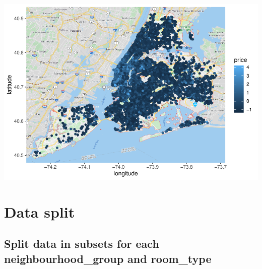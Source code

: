 \documentclass[
]{article}
\begin{document}
\includegraphics{project-code_files/figure-latex/unnamed-chunk-9-1.pdf}

\hypertarget{data-split}{%
\section{Data split}\label{data-split}}

\hypertarget{split-data-in-subsets-for-each-neighbourhood_group-and-room_type}{%
\subsection{Split data in subsets for each neighbourhood\_group and
room\_type}\label{split-data-in-subsets-for-each-neighbourhood_group-and-room_type}}
\end{document}
